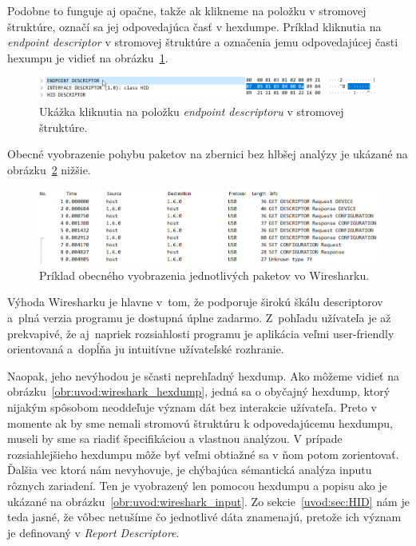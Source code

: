 Podobne to funguje aj opačne, takže ak klikneme na položku v stromovej štruktúre, označí sa jej odpovedajúca časť v hexdumpe. Príklad kliknutia na \textit{endpoint descriptor} v stromovej štruktúre a označenia jemu odpovedajúcej časti hexumpu je vidieť na obrázku~\ref{obr:uvod:tree_click}.

\begin{figure}[!htb]
	\centering
	\includegraphics[width=\textwidth]{img/uvod_wireshark_tree_click}
	\caption{Ukážka kliknutia na položku \textit{endpoint descriptoru} v stromovej štruktúre.}
	\label{obr:uvod:tree_click}
\end{figure}

Obecné vyobrazenie pohybu paketov na zbernici bez hlbšej analýzy je ukázané na obrázku~\ref{obr:uvod:wireshark_listview} nižšie.

\begin{figure}[!htb]
	\centering
	\includegraphics[width=\textwidth]{img/uvod_wireshark_listview}
	\caption{Príklad obecného vyobrazenia jednotlivých paketov vo Wiresharku.}
	\label{obr:uvod:wireshark_listview}
\end{figure}

Výhoda Wiresharku je hlavne v~tom, že podporuje širokú škálu descriptorov a~plná verzia programu je dostupná úplne zadarmo. Z~pohľadu užívateľa je až prekvapivé, že aj~napriek rozsiahlosti programu je aplikácia veľmi user-friendly orientovaná a~dopĺňa ju intuitívne užívateľské rozhranie.

Naopak, jeho nevýhodou je sčasti neprehľadný hexdump. Ako môžeme vidieť na obrázku~\ref{obr:uvod:wireshark_hexdump}, jedná sa o obyčajný hexdump, ktorý nijakým spôsobom neoddeľuje význam dát bez interakcie užívateľa. Preto v momente ak by sme nemali stromovú štruktúru k odpovedajúcemu hexdumpu, museli by sme sa riadiť špecifikáciou a vlastnou analýzou. V prípade rozsiahlejšieho hexdumpu môže byť veľmi obtiažné sa v ňom potom zorientovať. Ďalšia vec ktorá nám nevyhovuje, je chýbajúca sémantická analýza inputu rôznych zariadení. Ten je vyobrazený len pomocou hexdumpu a popisu  ako je ukázané na obrázku~\ref{obr:uvod:wireshark_input}. Zo sekcie~\ref{uvod:sec:HID} nám je teda jasné, že vôbec netušíme čo jednotlivé dáta znamenajú, pretože ich význam je definovaný v \textit{Report Descriptore}.


